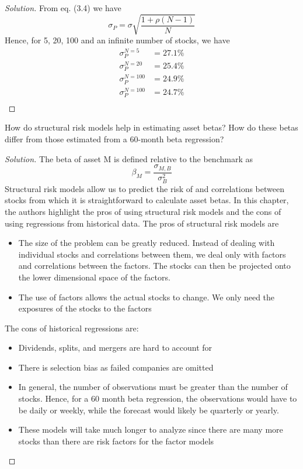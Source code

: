 \begin{proof}[Solution]
 From eq. (3.4) we have
 \begin{equation*}
  \sigma_{P}=\sigma\sqrt{\frac{1+\rho(N-1)}{N}}
 \end{equation*}
 Hence, for 5, 20, 100 and an infinite number of stocks, we have
 \begin{align*}
  \sigma_{P}^{N=5}&=27.1\%\\
  \sigma_{P}^{N=20}&=25.4\%\\
  \sigma_{P}^{N=100}&=24.9\%\\
  \sigma_{P}^{N=100}&=24.7\%\\
 \end{align*}
\end{proof}

\begin{problem}{3.4}
 How do structural risk models help in estimating asset betas? How do these betas differ from those estimated from a 60-month beta regression?
\end{problem}

\begin{proof}[Solution]
 The beta of asset M is defined relative to the benchmark as
 \begin{equation*}
  \beta_{M}=\frac{\sigma_{M,B}}{\sigma_{B}^{2}}
 \end{equation*}
 Structural risk models allow us to predict the risk of and correlations between stocks from which it is straightforward to calculate asset betas. In this chapter, the authors highlight the pros of using structural risk models and the cons of using regressions from historical data. The pros of structural risk models are
 \begin{itemize}
  \item{The size of the problem can be greatly reduced. Instead of dealing with individual stocks and correlations between them, we deal only with factors and correlations between the factors. The stocks can then be projected onto the lower dimensional space of the factors.}
  \item{The use of factors allows the actual stocks to change. We only need the exposures of the stocks to the factors}
 \end{itemize}
 The cons of historical regressions are:
 \begin{itemize}
  \item{ Dividends, splits, and mergers are hard to account for}
  \item{ There is selection bias as failed companies are omitted}
  \item{In general, the number of observations must be greater than the number of stocks. Hence, for a 60 month beta regression, the observations would have to be daily or weekly, while the forecast would likely be quarterly or yearly.}
  \item{These models will take much longer to analyze since there are many more stocks than there are risk factors for the factor models}
 \end{itemize}



\end{proof}


